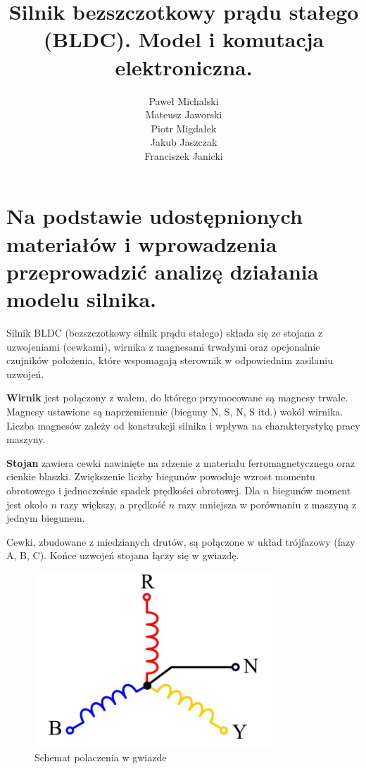 \documentclass[11pt]{article}
\title{Silnik bezszczotkowy prądu stałego (BLDC). Model i komutacja elektroniczna.}
\author{
  Paweł Michalski \\
  Mateusz Jaworski \\
  Piotr Migdałek \\
  Jakub Jaszczak \\
  Franciszek Janicki
}
\begin{document}
\maketitle

\tableofcontents
\newpage

\section{Na podstawie udostępnionych materiałów i wprowadzenia przeprowadzić analizę działania modelu silnika.}


Silnik BLDC (bezszczotkowy silnik prądu stałego) składa się ze stojana z uzwojeniami (cewkami), wirnika z magnesami trwałymi oraz opcjonalnie czujników położenia, które wspomagają sterownik w odpowiednim zasilaniu uzwojeń.

\medskip
\noindent
\textbf{Wirnik} jest połączony z wałem, do którego przymocowane są magnesy trwałe. Magnesy ustawione są naprzemiennie (bieguny N, S, N, S itd.) wokół wirnika. Liczba magnesów zależy od konstrukcji silnika i wpływa na charakterystykę pracy maszyny. 

\medskip
\noindent
\textbf{Stojan} zawiera cewki nawinięte na rdzenie z materiału ferromagnetycznego oraz cienkie blaszki. Zwiększenie liczby biegunów powoduje wzrost momentu obrotowego i jednocześnie spadek prędkości obrotowej. Dla \( n \) biegunów moment jest około \( n \) razy większy, a prędkość \( n \) razy mniejsza w porównaniu z maszyną z jednym biegunem.

Cewki, zbudowane z miedzianych drutów, są połączone w układ trójfazowy (fazy A, B, C). Końce uzwojeń stojana łączy się w gwiazdę.

\begin{figure}[H]
\centering
\includegraphics[width=0.8\textwidth]{aun2_star_connection.png}
\caption{Schemat polaczenia w gwiazde}
\end{figure}
\end{document}
